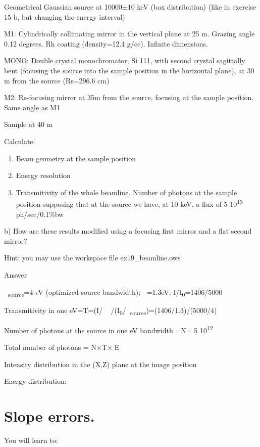 \documentclass[]{article}
\providecommand{\tightlist}{%
  \setlength{\itemsep}{0pt}\setlength{\parskip}{0pt}}
\begin{document}
Geometrical Gaussian source at 10000±10 keV (box distribution) (like in
exercise 15 b, but changing the energy interval)

M1: Cylindrically collimating mirror in the vertical plane at 25 m.
Grazing angle 0.12 degrees. Rh coating (density=12.4 g/cc). Infinite
dimensions.

MONO: Double crystal monochromator, Si 111, with second crystal
sagittally bent (focusing the source into the sample position in the
horizontal plane), at 30 m from the source (Rs=296.6 cm)

M2: Re-focusing mirror at 35m from the source, focusing at the sample
position. Same angle as M1

Sample at 40 m

Calculate:

\begin{enumerate}
\def\labelenumi{\roman{enumi})}
\tightlist
\item
  Beam geometry at the sample position
\item
  Energy resolution
\item
  Transmitivity of the whole beamline. Number of photons at the sample
  position supposing that at the source we have, at 10 keV, a flux of 5
  10\textsuperscript{13} ph/sec/0.1\%bw
\end{enumerate}

b) How are these results modified using a focusing first mirror and a
flat second mirror?

Hint: you may use the workspace file ex19\_beamline.ows

Answer

\textsubscript{source}=4 eV (optimized source bandwidth); =1.3eV;
I/I\textsubscript{0}=1406/5000

Transmitivity in one eV=T=(I/
/(I\textsubscript{0}/\textsubscript{source})=(1406/1.3)/(5000/4)

Number of photons at the source in one eV bandwidth =N= 5
10\textsuperscript{12}

Total number of photons = N×T×E

Intensity distribution in the (X,Z) plane at the image position

Energy distribution:

\section{Slope errors.}\label{slope-errors.}

You will learn to:
\end{document}
